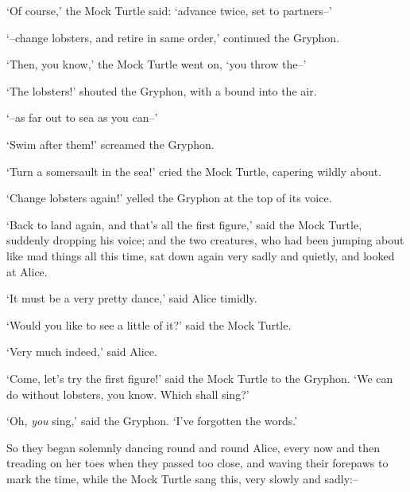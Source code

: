   `Of course,' the Mock Turtle said:  `advance twice, set to
partners--'

  `--change lobsters, and retire in same order,' continued the
Gryphon.

  `Then, you know,' the Mock Turtle went on, `you throw the--'

  `The lobsters!' shouted the Gryphon, with a bound into the air.

  `--as far out to sea as you can--'

  `Swim after them!' screamed the Gryphon.

  `Turn a somersault in the sea!' cried the Mock Turtle,
capering wildly about.

  `Change lobsters again!' yelled the Gryphon at the top of its voice.

  `Back to land again, and that's all the first figure,' said the
Mock Turtle, suddenly dropping his voice; and the two creatures,
who had been jumping about like mad things all this time, sat
down again very sadly and quietly, and looked at Alice.

  `It must be a very pretty dance,' said Alice timidly.

  `Would you like to see a little of it?' said the Mock Turtle.

  `Very much indeed,' said Alice.

  `Come, let's try the first figure!' said the Mock Turtle to the
Gryphon.  `We can do without lobsters, you know.  Which shall
sing?'

  `Oh, {\it you} sing,' said the Gryphon.  `I've forgotten the words.'

  So they began solemnly dancing round and round Alice, every now
and then treading on her toes when they passed too close, and
waving their forepaws to mark the time, while the Mock Turtle
sang this, very slowly and sadly:--


